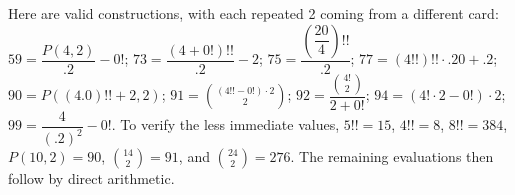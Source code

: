 Here are valid constructions, with each repeated 2 coming from a different card: $59=\dfrac{P(4,2)}{.2}-0!$; $73=\dfrac{(4+0!)!!}{.2}-2$; $75=\dfrac{\left(\dfrac{20}{4}\right)!!}{.2}$; $77=(4!!)!!\cdot.20+.2$; $90=P((4.0)!!+2,2)$; $91=\binom{(4!!-0!)\cdot2}{2}$; $92=\dfrac{\binom{4!}{2}}{2+0!}$; $94=(4!\cdot2-0!)\cdot2$; $99=\dfrac{4}{(.2)^2}-0!$. To verify the less immediate values, $5!!=15$, $4!!=8$, $8!!=384$, $P(10,2)=90$, $\binom{14}{2}=91$, and $\binom{24}{2}=276$. The remaining evaluations then follow by direct arithmetic.
